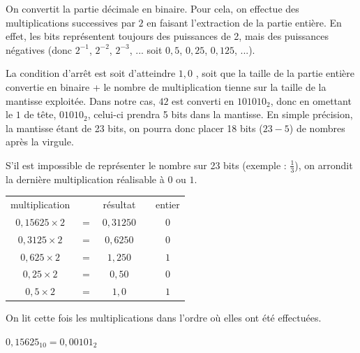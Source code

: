 \documentclass[11pt,a4paper]{article}
\begin{document}
\medskip

On convertit la partie décimale en binaire.
Pour cela, on effectue des multiplications successives par $ 2 $ en faisant l'extraction de la partie entière.
En effet, les bits représentent toujours des puissances de 2, mais des puissances négatives (donc $ 2^{-1} $, $ 2^{-2} $, $ 2^{-3} $, ... soit $ 0,5 $, $ 0,25 $, $ 0,125 $, ...).

\medskip

La condition d'arrêt est soit d'atteindre \og $ 1,0 $ \fg{}, soit que la taille de la partie entière convertie en binaire + le nombre de multiplication tienne sur la taille de la mantisse exploitée.
Dans notre cas, $ 42 $ est converti en $ 101010_{2} $, donc en omettant le $ 1 $ de tête, $ 01010_{2} $, celui-ci prendra 5 bits dans la mantisse.
En simple précision, la mantisse étant de 23 bits, on pourra donc placer 18 bits ($ 23 - 5 $) de nombres après la virgule.

S'il est impossible de représenter le nombre sur 23 bits (exemple : $ \frac{1}{3} $), on arrondit la dernière multiplication réalisable à $ 0 $ ou $ 1 $.

\medskip

\begin{center}
\begin{tabular}{c c c   m{1cm}   c }
multiplication        &         & résultat    & & entier \\
$ 0,15625 \times 2 $  &  $ = $  &  $ 0,31250 $ & & $ 0 $ \\
$ 0,3125  \times 2 $  &  $ = $  &  $ 0,6250  $ & & $ 0 $ \\
$ 0,625   \times 2 $  &  $ = $  &  $ 1,250   $ & & $ 1 $ \\
$ 0,25    \times 2 $  &  $ = $  &  $ 0,50    $ & & $ 0 $ \\
$ 0,5     \times 2 $  &  $ = $  &  $ 1,0     $ & & $ 1 $ \\
\end{tabular}
\end{center}

\medskip

On lit cette fois les multiplications dans l'ordre où elles ont été effectuées.

\medskip

$ 0,15625_{10} = 0,00101_{2} $
\end{document}
